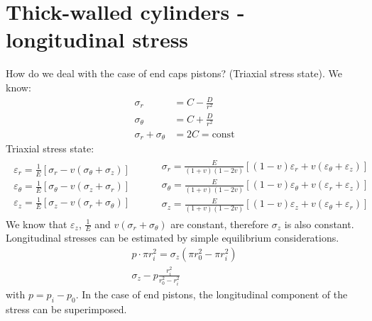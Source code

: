 \documentclass[class=report, crop=false, 12pt,a4paper]{standalone}
\begin{document}
\section{Thick-walled cylinders - longitudinal stress}
How do we deal with the case of end caps pistons? (Triaxial stress state). We know:
\begin{align}
    \sigma_r &= C - \frac{D}{r^2} \\
    \sigma_{\theta} &= C + \frac{D}{r^2}\\
    \sigma_r + \sigma_{\theta} &= 2C = \textrm{const}
\end{align}
Triaxial stress state:
\begin{gather}
    \begin{array}{l}
        \varepsilon_r = \frac{1}{E}\left[\sigma_{r} - v\left(\sigma_{\theta} + \sigma_z\right)\right]\\
        \varepsilon_{\theta} = \frac{1}{E}\left[\sigma_{\theta} - v\left(\sigma_z + \sigma_r\right)\right]\\
        \varepsilon_z = \frac{1}{E}\left[\sigma_z - v\left(\sigma_r + \sigma_{\theta}\right)\right]
    \end{array} \hspace{1cm} 
    \begin{array}{l}
        \sigma_r = \frac{E}{\left(1+v\right)\left(1-2v\right)} \left[\left(1-v\right)\varepsilon_r + v\left(\varepsilon_{\theta} + \varepsilon_z\right)\right]\\
        \sigma_{\theta} = \frac{E}{\left(1+v\right)\left(1-2v\right)} \left[\left(1-v\right)\varepsilon_{\theta} + v\left(\varepsilon_r + \varepsilon_z\right)\right]\\
        \sigma_z = \frac{E}{\left(1+v\right)\left(1-2v\right)} \left[\left(1-v\right)\varepsilon_z + v\left(\varepsilon_{\theta} + \varepsilon_r\right)\right]
    \end{array}
\end{gather}
We know that $\varepsilon_z$, $\frac{1}{E}$ and $v\left(\sigma_r + \sigma_{\theta}\right)$ are constant, therefore $\sigma_z$ is also constant. Longitudinal stresses can be estimated by simple equilibrium considerations.
\begin{gather}
    p \cdot \pi r_i^2 = \sigma_z \left(\pi r_0^2 - \pi r_i^2\right)\\
    \sigma_z - p \frac{r_i^2}{r_0^2 - r_i^2}
\end{gather}
with $p = p_i - p_0$. In the case of end pistons, the longitudinal component of the stress can be superimposed. 
\end{document}
